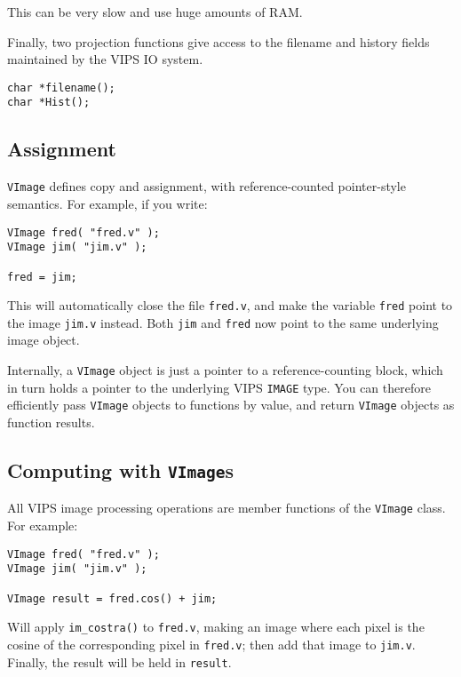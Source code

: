 \noindent
This can be very slow and use huge amounts of RAM.

Finally, two projection functions give access to the filename and history
fields maintained by the VIPS IO system.

\begin{verbatim}
char *filename();
char *Hist();
\end{verbatim}

\subsection{Assignment}

\verb+VImage+ defines copy and assignment, with reference-counted
pointer-style semantics.  For example, if you write:

\begin{verbatim}
VImage fred( "fred.v" );
VImage jim( "jim.v" );

fred = jim;
\end{verbatim}

This will automatically close the file \verb+fred.v+, and make the variable
\verb+fred+ point to the image \verb+jim.v+ instead. Both \verb+jim+ and
\verb+fred+ now point to the same underlying image object. 

Internally, a \verb+VImage+ object is just a pointer to a reference-counting
block, which in turn holds a pointer to the underlying VIPS \verb+IMAGE+ type.
You can therefore efficiently pass \verb+VImage+ objects to functions by
value, and return \verb+VImage+ objects as function results.

\subsection{Computing with \texttt{VImage}s}
\label{sec:compute}

All VIPS image processing operations are member functions of the \verb+VImage+
class. For example:

\begin{verbatim}
VImage fred( "fred.v" );
VImage jim( "jim.v" );

VImage result = fred.cos() + jim;
\end{verbatim}

Will apply \verb+im_costra()+ to \verb+fred.v+, making an image where each
pixel is the cosine of the corresponding pixel in \verb+fred.v+; then add that
image to \verb+jim.v+. Finally, the result will be held in \verb+result+.

